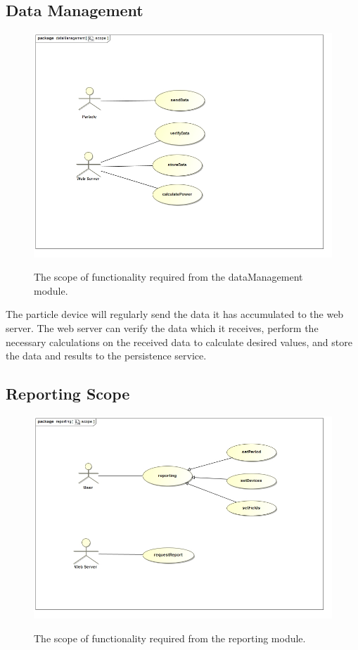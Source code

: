 \documentclass[paper=a4, fontsize=11pt]{scrartcl} %
\begin{document}
	\subsection{Data Management}
		\begin{figure}[H]
			\includegraphics[width=\textwidth]{images/dataManagementScope.jpg}  \\
			\caption{The scope of functionality required from the dataManagement module.}
		\end{figure}
		
		The particle device will regularly send the data it has accumulated to the web server. The web server can verify the data which it receives, perform the necessary calculations on the received data to calculate desired values, and store the data and results to the persistence service.
		
	\subsection{Reporting Scope}
	\begin{figure}[H]
		\includegraphics[width=\textwidth]{images/reportingScope.jpg}  \\
		\caption{The scope of functionality required from the reporting module.}
	\end{figure}
	
\end{document}
